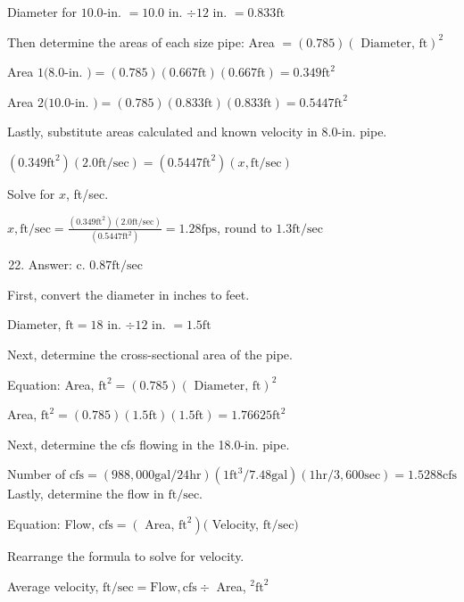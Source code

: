 \documentclass[10pt]{article}
\begin{document}
Diameter for $10.0$-in. $=10.0$ in. $\div 12$ in. $=0.833 \mathrm{ft}$

Then determine the areas of each size pipe: Area $=(0.785)(\text { Diameter, } \mathrm{ft})^{2}$

Area $1(8.0$-in. $)=(0.785)(0.667 \mathrm{ft})(0.667 \mathrm{ft})=0.349 \mathrm{ft}^{2}$

Area $2(10.0$-in. $)=(0.785)(0.833 \mathrm{ft})(0.833 \mathrm{ft})=0.5447 \mathrm{ft}^{2}$

Lastly, substitute areas calculated and known velocity in 8.0-in. pipe.

$\left(0.349 \mathrm{ft}^{2}\right)(2.0 \mathrm{ft} / \mathrm{sec})=\left(0.5447 \mathrm{ft}^{2}\right)(x, \mathrm{ft} / \mathrm{sec})$

Solve for $x$, ft/sec.

$x, \mathrm{ft} / \mathrm{sec}=\frac{\left(0.349 \mathrm{ft}^{2}\right)(2.0 \mathrm{ft} / \mathrm{sec})}{\left(0.5447 \mathrm{ft}^{2}\right)}=1.28 \mathrm{fps}$, round to $1.3 \mathrm{ft} / \mathrm{sec}$

\begin{enumerate}
  \setcounter{enumi}{21}
  \item Answer: c. $0.87 \mathrm{ft} / \mathrm{sec}$
\end{enumerate}

First, convert the diameter in inches to feet.

Diameter, $\mathrm{ft}=18$ in. $\div 12$ in. $=1.5 \mathrm{ft}$

Next, determine the cross-sectional area of the pipe.

Equation: Area, $\mathrm{ft}^{2}=(0.785)(\text { Diameter, } \mathrm{ft})^{2}$

Area, $\mathrm{ft}^{2}=(0.785)(1.5 \mathrm{ft})(1.5 \mathrm{ft})=1.76625 \mathrm{ft}^{2}$

Next, determine the cfs flowing in the 18.0-in. pipe.

Number of $\mathrm{cfs}=(988,000 \mathrm{gal} / 24 \mathrm{hr})\left(1 \mathrm{ft}^{3} / 7.48 \mathrm{gal}\right)(1 \mathrm{hr} / 3,600 \mathrm{sec})=1.5288 \mathrm{cfs}$ Lastly, determine the flow in $\mathrm{ft} / \mathrm{sec}$.

Equation: Flow, $\mathrm{cfs}=\left(\right.$ Area, $\left.\mathrm{ft}^{2}\right)($ Velocity, $\mathrm{ft} / \mathrm{sec})$

Rearrange the formula to solve for velocity.

Average velocity, $\mathrm{ft} / \mathrm{sec}=\mathrm{Flow}, \mathrm{cfs} \div$ Area, $^{2} \mathrm{ft}^{2}$
\end{document}
